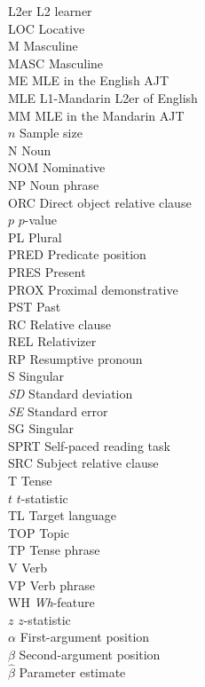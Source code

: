 \documentclass[12pt]{report}
\begin{document}
\begin{multicols}{2}
\begin{tabbing}
L2er \> L2 learner \\
LOC \> Locative \\
M \> Masculine \\
MASC \> Masculine \\
ME \> MLE in the English AJT \\
MLE \> L1-Mandarin L2er of English \\
MM \> MLE in the Mandarin AJT \\
$n$ \> Sample size \\
N \> Noun \\
NOM \> Nominative \\
NP \> Noun phrase \\
ORC \> Direct object relative clause \\
$p$ \> $p$-value \\
PL \> Plural \\
PRED \> Predicate position \\
PRES \> Present \\
PROX \> Proximal demonstrative \\
PST \> Past \\
RC \> Relative clause \\
REL \> Relativizer \\
RP \> Resumptive pronoun \\
S \> Singular \\
\textit{SD} \> Standard deviation \\
\textit{SE} \> Standard error \\
SG \> Singular \\
SPRT \> Self-paced reading task \\
SRC \> Subject relative clause \\
T \> Tense \\
$t$ \> $t$-statistic \\
TL \> Target language \\
TOP \> Topic \\
TP \> Tense phrase \\
V \> Verb \\
VP \> Verb phrase \\
WH \>\textit{Wh}-feature \\
$z$ \> $z$-statistic \\
$\alpha$ \> First-argument position \\
$\beta$ \> Second-argument position \\
$\hat{\beta}$ \> Parameter estimate \\
\end{tabbing}
\end{multicols}
\end{document}
